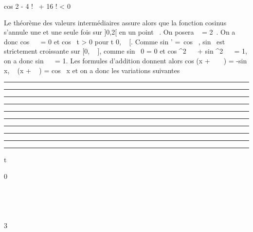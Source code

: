 \documentclass[]{article}
\begin{document}
cos 2  - 4 !~ +
16 ! \textless{} 0

Le théorème des valeurs intermédiaires assure alors que la fonction
cosinus s'annule une et une seule fois sur {]}0,2{[} en un point \alpha~. On
posera \pi~ = 2\alpha~. On a donc cos~  \pi~
 = 0 et cos~ t
\textgreater{} 0 pour t \in {[}0, \pi~  {[}. Comme
sin ' =\ cos~ ,
sin~ est strictement croissante sur {[}0, \pi~
 {]}, comme sin~ 0 = 0
et cos ^2~ \pi~  + sin ^2~ \pi~
 = 1, on a donc sin~ 
\pi~  = 1. Les formules d'addition donnent alors
cos (x + \pi~ ~ ) =
-sin x, \sin~ (x + \pi~
 ) = cos~ x et on a
donc les variations suivantes

\begin{center}\rule{3in}{0.4pt}\end{center}

\begin{center}\rule{3in}{0.4pt}\end{center}

\begin{center}\rule{3in}{0.4pt}\end{center}

\begin{center}\rule{3in}{0.4pt}\end{center}

\begin{center}\rule{3in}{0.4pt}\end{center}

\begin{center}\rule{3in}{0.4pt}\end{center}

\begin{center}\rule{3in}{0.4pt}\end{center}

\begin{center}\rule{3in}{0.4pt}\end{center}

\begin{center}\rule{3in}{0.4pt}\end{center}

\begin{center}\rule{3in}{0.4pt}\end{center}

t

0

 \pi~ 

\pi~

 3\pi~ 
\end{document}
